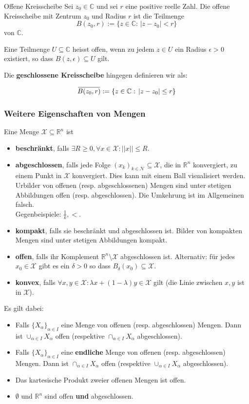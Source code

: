 \documentclass[a4paper,10pt]{article}
\def\X{\mathcal{X}}
\def\N{\mathcal{N}}
\def\R{\mathbb{R}}
\def\C{\mathbb{C}}
\newcommand{\overbar}[1]{\mkern 1.5mu\overline{\mkern-1.5mu#1\mkern-1.5mu}\mkern 1.5mu}
\begin{document}
\begin{subbox}{Offene Kreisscheibe}
  Sei $z_0\in\mathbb{C}$ und sei $r$ eine positive reelle Zahl. Die offene Kreisscheibe mit Zentrum $z_0$ und Radius $r$ ist die Teilmenge
  $$
  B(z_0, r) := \{ z \in \mathbb{C} : \, |z-z_0| < r \}
  $$
  von $\mathbb{C}$.
\end{subbox}

Eine Teilmenge $U \subseteq \C$ heisst offen, wenn zu jedem $z \in U$ ein Radius $\epsilon>0$ existiert, so dass $B(z,\epsilon) \subseteq U$ gilt.

Die \textbf{geschlossene Kreisscheibe} hingegen definieren wir als:

$$
\overbar{B(z_0, r)} := \{ z \in \mathbb{C} : \, |z-z_0| \leq r \}
$$

\subsubsection{Weitere Eigenschaften von Mengen}

Eine Menge \(\X \subseteq \R^n \) ist
\begin{itemize}
  \item \textbf{beschränkt}, falls \(\exists R \ge 0, \forall x \in \X: ||x|| \le R\).
  \item \textbf{abgeschlossen}, falls jede Folge \((x_k)_{k\in \N} \subseteq \X\), die in \(\R^n\) konvergiert, zu einem Punkt in \(\X\) konvergiert. Dies kann mit einem Ball visualisiert werden. \\Urbilder von offenen (resp. abgeschlossenen) Mengen sind unter stetigen Abbildungen offen (resp. abgeschlossen). Die Umkehrung ist im Allgemeinen falsch.\\
  Gegenbeispiele: \(\frac{1}{k}, <\).
  \item \textbf{kompakt}, falls sie beschränkt und abgeschlossen ist. Bilder von kompakten Mengen sind unter stetigen Abbildungen kompakt.
  \item \textbf{offen}, falls ihr Komplement \(\R^n \setminus \X\) abgeschlossen ist. Alternativ: für jedes $x_0 \in \X$ gibt es ein $\delta > 0$ so dass $B_\delta(x_0) \subseteq \X$.
  \item \textbf{konvex}, falls \(\forall x, y \in \X: \lambda x + (1 - \lambda)y \in \X\) gilt (die Linie zwischen \(x, y\) ist in \(\X\)).
\end{itemize}

Es gilt dabei:

\begin{itemize}
  \item Falls $\{X_\alpha\}_{\alpha \in I}$ eine Menge von offenen (resp. abgeschlossen) Mengen. Dann ist $\cup_{\alpha \in I} X_\alpha$ offen (respektive $\cap_{\alpha \in I} X_\alpha$ abgeschlossen).
  \item Falls $\{X_\alpha\}_{\alpha \in I}$ eine \textbf{endliche} Menge von offenen (resp. abgeschlossen) Mengen. Dann ist $\cap_{\alpha \in I} X_\alpha$ offen (respektive $\cup_{\alpha \in I} X_\alpha$ abgeschlossen).
  \item Das kartesische Produkt zweier offenen Mengen ist offen.
  \item $\emptyset$ und $\R^n$ sind offen \textbf{und} abgeschlossen.
\end{itemize}
\end{document}
